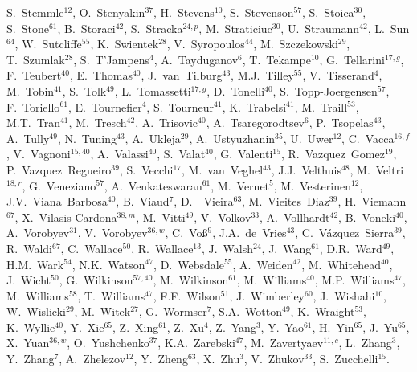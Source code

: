 \begin{flushleft}
S.~Stemmle$^{12}$,
O.~Stenyakin$^{37}$,
H.~Stevens$^{10}$,
S.~Stevenson$^{57}$,
S.~Stoica$^{30}$,
S.~Stone$^{61}$,
B.~Storaci$^{42}$,
S.~Stracka$^{24,p}$,
M.~Straticiuc$^{30}$,
U.~Straumann$^{42}$,
L.~Sun$^{64}$,
W.~Sutcliffe$^{55}$,
K.~Swientek$^{28}$,
V.~Syropoulos$^{44}$,
M.~Szczekowski$^{29}$,
T.~Szumlak$^{28}$,
S.~T'Jampens$^{4}$,
A.~Tayduganov$^{6}$,
T.~Tekampe$^{10}$,
G.~Tellarini$^{17,g}$,
F.~Teubert$^{40}$,
E.~Thomas$^{40}$,
J.~van~Tilburg$^{43}$,
M.J.~Tilley$^{55}$,
V.~Tisserand$^{4}$,
M.~Tobin$^{41}$,
S.~Tolk$^{49}$,
L.~Tomassetti$^{17,g}$,
D.~Tonelli$^{40}$,
S.~Topp-Joergensen$^{57}$,
F.~Toriello$^{61}$,
E.~Tournefier$^{4}$,
S.~Tourneur$^{41}$,
K.~Trabelsi$^{41}$,
M.~Traill$^{53}$,
M.T.~Tran$^{41}$,
M.~Tresch$^{42}$,
A.~Trisovic$^{40}$,
A.~Tsaregorodtsev$^{6}$,
P.~Tsopelas$^{43}$,
A.~Tully$^{49}$,
N.~Tuning$^{43}$,
A.~Ukleja$^{29}$,
A.~Ustyuzhanin$^{35}$,
U.~Uwer$^{12}$,
C.~Vacca$^{16,f}$,
V.~Vagnoni$^{15,40}$,
A.~Valassi$^{40}$,
S.~Valat$^{40}$,
G.~Valenti$^{15}$,
R.~Vazquez~Gomez$^{19}$,
P.~Vazquez~Regueiro$^{39}$,
S.~Vecchi$^{17}$,
M.~van~Veghel$^{43}$,
J.J.~Velthuis$^{48}$,
M.~Veltri$^{18,r}$,
G.~Veneziano$^{57}$,
A.~Venkateswaran$^{61}$,
M.~Vernet$^{5}$,
M.~Vesterinen$^{12}$,
J.V.~Viana~Barbosa$^{40}$,
B.~Viaud$^{7}$,
D.~~Vieira$^{63}$,
M.~Vieites~Diaz$^{39}$,
H.~Viemann$^{67}$,
X.~Vilasis-Cardona$^{38,m}$,
M.~Vitti$^{49}$,
V.~Volkov$^{33}$,
A.~Vollhardt$^{42}$,
B.~Voneki$^{40}$,
A.~Vorobyev$^{31}$,
V.~Vorobyev$^{36,w}$,
C.~Vo{\ss}$^{9}$,
J.A.~de~Vries$^{43}$,
C.~V{\'a}zquez~Sierra$^{39}$,
R.~Waldi$^{67}$,
C.~Wallace$^{50}$,
R.~Wallace$^{13}$,
J.~Walsh$^{24}$,
J.~Wang$^{61}$,
D.R.~Ward$^{49}$,
H.M.~Wark$^{54}$,
N.K.~Watson$^{47}$,
D.~Websdale$^{55}$,
A.~Weiden$^{42}$,
M.~Whitehead$^{40}$,
J.~Wicht$^{50}$,
G.~Wilkinson$^{57,40}$,
M.~Wilkinson$^{61}$,
M.~Williams$^{40}$,
M.P.~Williams$^{47}$,
M.~Williams$^{58}$,
T.~Williams$^{47}$,
F.F.~Wilson$^{51}$,
J.~Wimberley$^{60}$,
J.~Wishahi$^{10}$,
W.~Wislicki$^{29}$,
M.~Witek$^{27}$,
G.~Wormser$^{7}$,
S.A.~Wotton$^{49}$,
K.~Wraight$^{53}$,
K.~Wyllie$^{40}$,
Y.~Xie$^{65}$,
Z.~Xing$^{61}$,
Z.~Xu$^{4}$,
Z.~Yang$^{3}$,
Y.~Yao$^{61}$,
H.~Yin$^{65}$,
J.~Yu$^{65}$,
X.~Yuan$^{36,w}$,
O.~Yushchenko$^{37}$,
K.A.~Zarebski$^{47}$,
M.~Zavertyaev$^{11,c}$,
L.~Zhang$^{3}$,
Y.~Zhang$^{7}$,
A.~Zhelezov$^{12}$,
Y.~Zheng$^{63}$,
X.~Zhu$^{3}$,
V.~Zhukov$^{33}$,
S.~Zucchelli$^{15}$.\bigskip


\end{flushleft}
